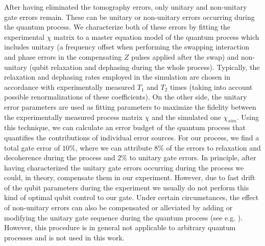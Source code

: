 After having eliminated the tomography errors, only unitary and non-unitary gate errors remain. These can be unitary or non-unitary errors occurring during the quantum process. We characterize both of these errors by fitting the experimental $\chi$ matrix to a master equation model of the quantum process which includes unitary (a frequency offset when performing the swapping interaction and phase errors in the compensating $Z$ pulses applied after the swap) and non-unitary (qubit relaxation and dephasing during the whole process). Typically, the relaxation and dephasing rates employed in the simulation are chosen in accordance with experimentally measured $T_1$ and $T_2$ times (taking into account possible renormalizations of these coefficients). On the other side, the unitary error parameters are used as fitting parameters to maximize the fidelity between the experimentally measured process matrix $\chi$ and the simulated one $\chi_{sim}$. Using this technique, we can calculate an error budget of the quantum process that quantifies the contributions of individual error sources. For our process, we find a total gate error of $10 \%$, where we can attribute $8\%$ of the errors to relaxation and decoherence during the process and $2\%$ to unitary gate errors. In principle, after having characterized the unitary gate errors occurring during the process we could, in theory, compensate them in our experiment. However, due to fast drift of the qubit parameters during the experiment we usually do not perform this kind of optimal qubit control to our gate. Under certain circumstances, the effect of non-unitary errors can also be compensated or alleviated by adding or modifying the unitary gate sequence during the quantum process (see e.g. \citep{lange_universal_2010}). However, this procedure is in general not applicable to arbitrary quantum processes and is not used in this work.

\smallskip

